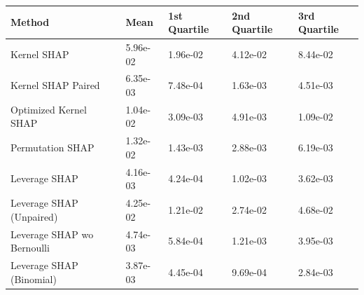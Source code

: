 \begin{tabular}{lllll}
  \toprule
  \textbf{Method} & \textbf{Mean} & \textbf{1st Quartile} & \textbf{2nd Quartile} & \textbf{3rd Quartile} \\ \midrule
Kernel SHAP & 5.96e-02 & 1.96e-02 & 4.12e-02 & 8.44e-02\\
Kernel SHAP Paired & 6.35e-03 & 7.48e-04 & 1.63e-03 & 4.51e-03\\
Optimized Kernel SHAP & 1.04e-02 & 3.09e-03 & 4.91e-03 & 1.09e-02\\
Permutation SHAP & 1.32e-02 & 1.43e-03 & 2.88e-03 & 6.19e-03\\
Leverage SHAP & \cellcolor{silver!60}4.16e-03 & \cellcolor{gold!60}4.24e-04 & \cellcolor{silver!60}1.02e-03 & \cellcolor{silver!60}3.62e-03\\
Leverage SHAP (Unpaired) & 4.25e-02 & 1.21e-02 & 2.74e-02 & 4.68e-02\\
Leverage SHAP wo Bernoulli & \cellcolor{bronze!60}4.74e-03 & \cellcolor{bronze!60}5.84e-04 & \cellcolor{bronze!60}1.21e-03 & \cellcolor{bronze!60}3.95e-03\\
Leverage SHAP (Binomial) & \cellcolor{gold!60}3.87e-03 & \cellcolor{silver!60}4.45e-04 & \cellcolor{gold!60}9.69e-04 & \cellcolor{gold!60}2.84e-03\\
\bottomrule
\end{tabular}
